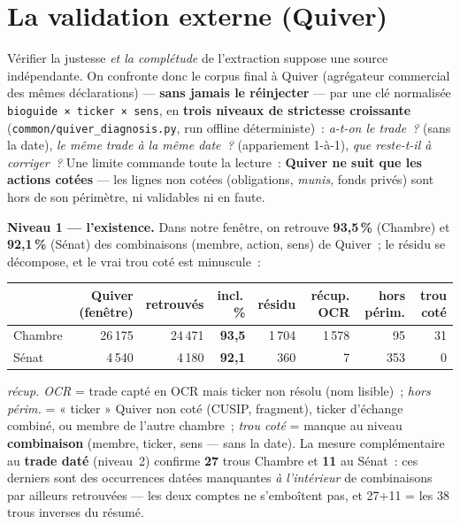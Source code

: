 \documentclass[11pt,a4paper]{article}
\newcommand{\co}[1]{\texttt{\small #1}}
\begin{document}
\FloatBarrier

\section{La validation externe (Quiver)}
\label{sec:quiver}

Vérifier la justesse \emph{et la complétude} de l'extraction suppose une source indépendante. On confronte
donc le corpus final à Quiver (agrégateur commercial des mêmes déclarations) — \textbf{sans jamais le
réinjecter} — par une clé normalisée \co{bioguide × ticker × sens}, en \textbf{trois niveaux de strictesse
croissante} (\co{common/quiver_diagnosis.py}, run offline déterministe)~: \emph{a-t-on le trade~?} (sans la
date), \emph{le même trade à la même date~?} (appariement 1-à-1), \emph{que reste-t-il à corriger~?} Une
limite commande toute la lecture~: \textbf{Quiver ne suit que les actions cotées} — les lignes non cotées
(obligations, \emph{munis}, fonds privés) sont hors de son périmètre, ni validables ni en faute.

\textbf{Niveau 1 — l'existence.} Dans notre fenêtre, on retrouve \textbf{93,5\,\%} (Chambre) et
\textbf{92,1\,\%} (Sénat) des combinaisons (membre, action, sens) de Quiver~; le résidu se décompose, et le
vrai trou coté est minuscule~:
\begin{center}\footnotesize
\begin{tabular}{l rrr rrrr}
\toprule
& \bfseries Quiver (fenêtre) & \bfseries retrouvés & \bfseries incl.\,\% & \bfseries résidu & \bfseries récup. OCR & \bfseries hors périm. & \bfseries trou coté\\
\midrule
Chambre & 26\,175 & 24\,471 & \textbf{93,5} & 1\,704 & 1\,578 & 95 & 31 \\
Sénat & 4\,540 & 4\,180 & \textbf{92,1} & 360 & 7 & 353 & 0 \\
\bottomrule
\end{tabular}
\end{center}
{\footnotesize \emph{récup. OCR} = trade capté en OCR mais ticker non résolu (nom lisible)~;
\emph{hors périm.} = « ticker » Quiver non coté (CUSIP, fragment), ticker d'échange combiné, ou membre de
l'autre chambre~; \emph{trou coté} = manque au niveau \textbf{combinaison} (membre, ticker, sens — sans la date). La mesure complémentaire au \textbf{trade daté} (niveau~2) confirme \textbf{27} trous Chambre et \textbf{11} au Sénat~: ces derniers sont des occurrences datées manquantes \emph{à l'intérieur} de combinaisons par ailleurs retrouvées — les deux comptes ne s'emboîtent pas, et 27+11 = les 38 trous inverses du résumé.}
\end{document}
